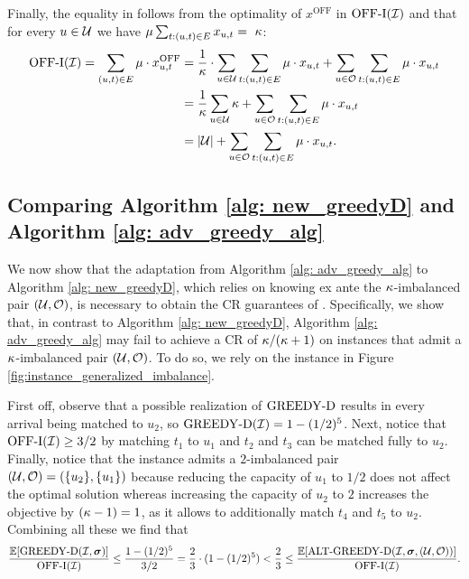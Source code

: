 {    Finally, the equality in  follows from the optimality of $x^{\mathrm{OFF}}$ in $\mathrm{\mathrm{OFF}}\textrm{-}\mathrm{I}(\mathcal I)$ and that for every $u \in \mathcal U$ we have $\mu \sum_{t: (u,t) \in E} x_{u,t} =~\kappa$:
\begin{align*}
        \mathrm{\mathrm{OFF}}\textrm{-}\mathrm{I}(\mathcal I) = \sum_{(u,t) \in E} \mu \cdot x^{\mathrm{OFF}}_{u,t} 
        &= \frac{1}{\kappa} \cdot \sum_{u \in \mathcal U} \sum_{t: (u,t) \in E} \mu \cdot x_{u,t} + \sum_{u \in \mathcal O} \sum_{t: (u,t) \in E} \mu \cdot x_{u,t}\\
        &= \frac{1}{\kappa} \sum_{u \in \mathcal U} \kappa + \sum_{u \in \mathcal O} \sum_{t: (u,t) \in E} \mu \cdot x_{u,t}\\
        &= |\mathcal U| + \sum_{u \in \mathcal O} \sum_{t: (u,t) \in E} \mu \cdot x_{u,t}.
    \end{align*}
    \hfill \Halmos

\subsection{Comparing Algorithm \ref{alg: new_greedyD} and Algorithm \ref{alg: adv_greedy_alg}}
\label{ssec: example_newgreedy}
We now show that the adaptation from Algorithm \ref{alg: adv_greedy_alg} to Algorithm \ref{alg: new_greedyD}, which relies on knowing ex ante the $\kappa$-imbalanced pair $(\mathcal U,\mathcal O)$, is necessary to obtain the CR guarantees of . %
Specifically, we show that, in contrast to Algorithm \ref{alg: new_greedyD}, Algorithm \ref{alg: adv_greedy_alg} may fail to achieve a CR of $\kappa/(\kappa+1)$ on instances that admit a $\kappa$-imbalanced pair $(\mathcal U,\mathcal O)$. To do so, we rely on the instance in Figure \ref{fig:instance_generalized_imbalance}.


 First off, observe that  a possible realization of $\mathrm{GREEDY\textrm{-}D}$ results in every arrival being matched to $u_2$, so $\mathrm{GREEDY\textrm{-}D}(\mathcal I) = 1 - (1/2)^5$.  Next, notice that $\mathrm{\mathrm{OFF}}\textrm{-}\mathrm{I}(\mathcal I) \geq 3/2$ by matching $t_1$ to $u_1$ and $t_2$ and $t_3$ can be matched fully to $u_2$. Finally, notice that the instance admits a $2$-imbalanced pair $(\mathcal U, \mathcal O) = (\{ u_2 \}, \{ u_1\})$ because reducing the capacity of $u_1$ to $1/2$ does not affect the optimal solution whereas increasing the capacity of $u_2$ to $2$ increases the objective by $(\kappa-1)=1$, as it allows to additionally match $t_4$ and $t_5$ to $u_2$. Combining all these we find that
\begin{equation*}
    \frac{\mathbb E[\mathrm{GREEDY\textrm{-}D}(\mathcal I, \bm{\sigma})]}{\mathrm{\mathrm{OFF}}\textrm{-}\mathrm{I}(\mathcal I)} \leq \frac{1 - (1/2)^5}{3/2} = \frac{2}{3} \cdot (1 - (1/2)^5) < \frac{2}{3} \leq \frac{\mathbb E[\mathrm{ALT\textrm{-}GREEDY\textrm{-}D}(\mathcal I, \bm{\sigma}, (\mathcal U, \mathcal O))]}{\mathrm{\mathrm{OFF}}\textrm{-}\mathrm{I}(\mathcal I)}.
\end{equation*}
}
